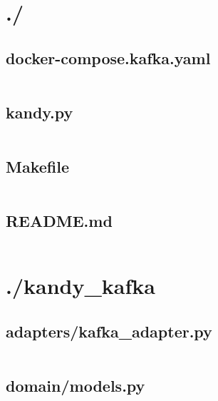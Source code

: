 \documentclass[10pt , a4paper]{report}
\newenvironment{code}{\captionsetup{type=listing}}{}
\begin{document}
\section{./}
\subsection{docker-compose.kafka.yaml}
\begin{code}
  \inputminted[fontsize=\small]{YAML}{../docker-compose.kafka.yaml}
\end{code}

\subsection{kandy.py}
\begin{code}
  \inputminted[fontsize=\small]{Python}{../kandy.py}
\end{code}

\subsection{Makefile}
\begin{code}
  \inputminted[fontsize=\small]{make}{../Makefile}
\end{code}

\subsection{README.md}
\begin{code}
  \inputminted[fontsize=\small]{MarkDown}{../README.md}
\end{code}

\newpage
\section{./kandy\_kafka}
\subsection{adapters/kafka\_adapter.py}
\begin{code}
  \inputminted[fontsize=\small]{Python}{../kandy_kafka/adapters/kafka_adapter.py}
\end{code}

\subsection{domain/models.py}
\begin{code}
  \inputminted[fontsize=\small]{Python}{../kandy_kafka/domain/models.py}
\end{code}
\end{document}

